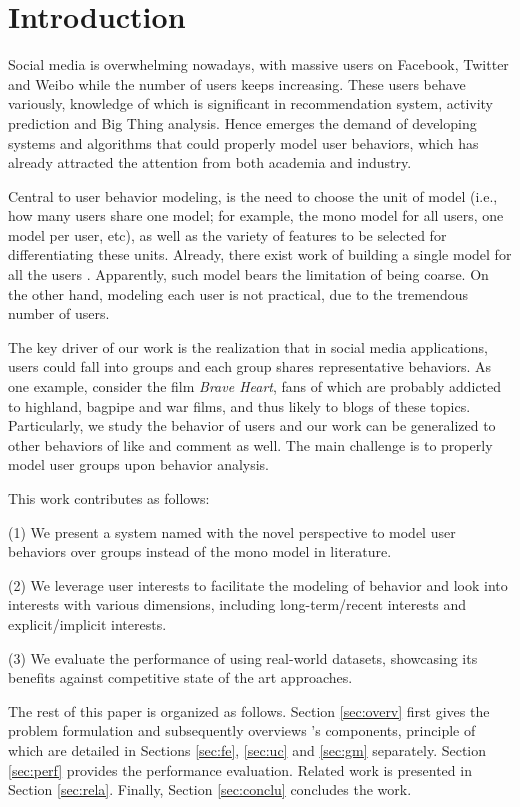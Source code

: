 \section{Introduction}
\label{sec:intro}

Social media is overwhelming nowadays, with massive users on Facebook, Twitter and Weibo while the number of users keeps increasing.
These users behave variously, knowledge of which is significant in recommendation system, activity prediction and Big Thing analysis.
Hence emerges the demand of developing systems and algorithms that could properly model user behaviors, which has already attracted the attention from both academia and industry.

Central to user behavior modeling, is the need to choose the unit of model (i.e., how many users share one model; for example, the mono model for all users, one model per user, etc), as well as the variety of features to be selected for differentiating these units.
Already, there exist work of building a single model for all the users .
Apparently, such model bears the limitation of being coarse.
On the other hand, modeling each user is not practical, due to the tremendous number of users.

The key driver of our work is the realization that in social media applications, users could fall into groups and each group shares representative behaviors.
%
As one example, consider the film \textit{Brave Heart}, fans of which are probably addicted to highland, bagpipe and war films, and thus likely to \ret{} blogs of these topics. 
Particularly, we study the \retg{} behavior of users and our work can be generalized to other behaviors of like and comment as well.
The main challenge is to properly model user groups upon behavior analysis.

This work contributes as follows:

\stab(1) We present a system named \sys{} with the novel perspective to model user behaviors over groups instead of the mono model in literature.

\stab(2) We leverage user interests to facilitate the modeling of \retg{} behavior and look into interests with various dimensions, including long-term/recent interests and explicit/implicit interests.

\stab(3) We evaluate the performance of \sys{} using real-world datasets, showcasing its benefits against competitive state of the art approaches.



 The rest of this paper is organized as follows.
Section \ref{sec:overv} first gives the problem formulation and subsequently overviews \sys{}'s components, principle of which are detailed in Sections \ref{sec:fe}, \ref{sec:uc} and \ref{sec:gm} separately.
Section \ref{sec:perf} provides the performance evaluation.
Related work is presented in Section \ref{sec:rela}.
Finally, Section \ref{sec:conclu} concludes the work.











